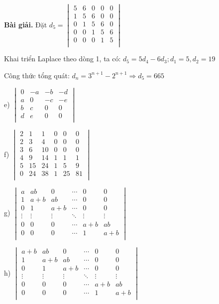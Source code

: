 \documentclass[12pt]{report}
\begin{document}
\textbf{Bài giải.} Đặt $d_5 = \begin{vmatrix}
	5 & 6 & 0 & 0 & 0 \\
	1 & 5 & 6 & 0 & 0 \\
	0 & 1 & 5 & 6 & 0 \\
	0 & 0 & 1 & 5 & 6 \\
	0 & 0 & 0 & 1 & 5 \\
\end{vmatrix}$

Khai triển Laplace theo dòng 1, ta có: $d_5 = 5d_4 -6d_3; d_1 = 5, d_2 = 19$

Công thức tổng quát: $d_n = 3^{n+1} - 2^{n+1} \Rightarrow d_5 = 665$

e) $\begin{vmatrix}
	0 & -a & -b & -d \\
	a & 0 & -c & -e \\
	b & c & 0 & 0 \\
	d & e & 0 & 0 \\
\end{vmatrix}$

f) $\begin{vmatrix}
	2 & 1 & 1 & 0 & 0 & 0 \\
	2 & 3 & 4 & 0 & 0 & 0 \\
	3 & 6 & 10 & 0 & 0 & 0 \\
	4 & 9 & 14 & 1 & 1 & 1 \\
	5 & 15 & 24 & 1 & 5 & 9 \\
	0 & 24 & 38 & 1 & 25 & 81 \\
\end{vmatrix}$

g) $\begin{vmatrix}
	a & ab & 0 & \cdots & 0 & 0 \\
	1 & a+b & ab & \cdots & 0 & 0 \\
	0 & 1 & a+b & \cdots & 0 & 0 \\
	\vdots & \vdots & \vdots & \ddots & \vdots & \vdots \\
	0 & 0 & 0 & \cdots & a+b & ab \\
	0 & 0 & 0 & \cdots & 1 & a+b \\
\end{vmatrix}$

h) $\begin{vmatrix}
	a+b & ab & 0 & \cdots & 0 & 0 \\
	1 & a+b & ab & \cdots & 0 & 0 \\
	0 & 1 & a+b & \cdots & 0 & 0 \\
	\vdots & \vdots & \vdots & \ddots & \vdots & \vdots \\
	0 & 0 & 0 & \cdots & a+b & ab \\
	0 & 0 & 0 & \cdots & 1 & a+b \\
\end{vmatrix}$
\end{document}
